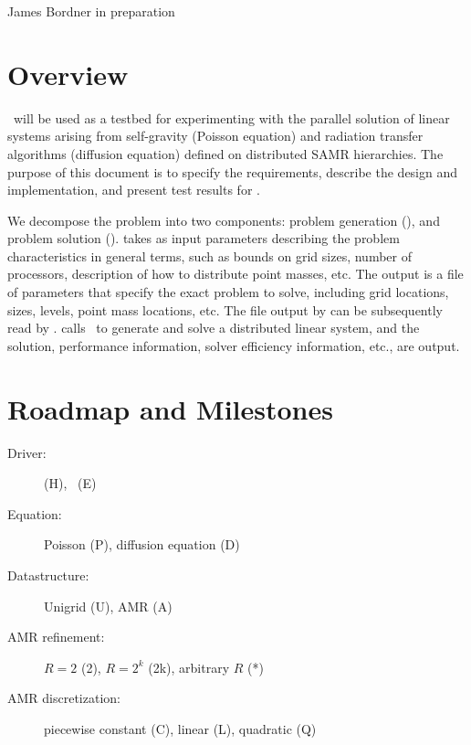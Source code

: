 \documentclass[10pt]{article}
\begin{document}
      {James Bordner}
      {in preparation}

\tableofcontents
\section{Overview}

   \hypresolve\ will be used as a testbed for experimenting with the
   parallel solution of linear systems arising from self-gravity
   (Poisson equation) and radiation transfer algorithms (diffusion
   equation) defined on distributed SAMR hierarchies.  The purpose of
   this document is to specify the requirements, describe the design
   and implementation, and present test results for \hypresolve.

   We decompose the problem into two components: problem generation
   (), and problem solution ().
    takes as input parameters describing the problem
   characteristics in general terms, such as bounds on grid sizes,
   number of processors, description of how to distribute point
   masses, etc.  The output is a file of parameters that specify the
   exact problem to solve, including grid locations, sizes, levels,
   point mass locations, etc.  The file output by 
   can be subsequently read by .  
   calls \hypre\ to generate and solve a distributed linear system,
   and the solution, performance information, solver efficiency
   information, etc., are output.

\section{Roadmap and Milestones}


\begin{description}
\item[Driver: ]  (H), \enzo\ (E)
\item[Equation: ] Poisson (P), diffusion equation (D)
\item[Datastructure: ] Unigrid (U), AMR (A)
\item[AMR refinement: ] $R=2$ (2), $R=2^k$ (2k), arbitrary $R$ (*)
\item[AMR discretization: ] piecewise constant (C), linear (L), quadratic (Q)
\end{description}
\end{document}
